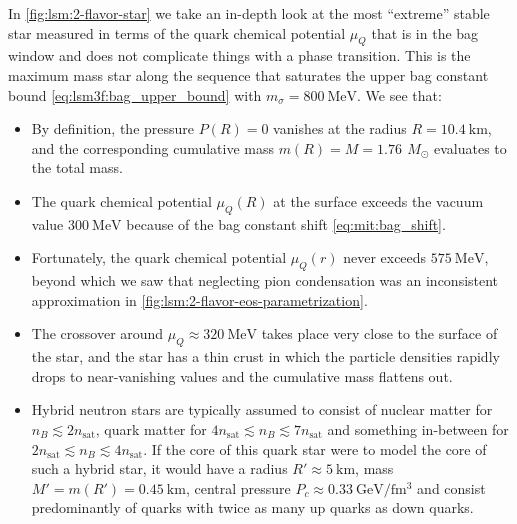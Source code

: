 In \cref{fig:lsm:2-flavor-star} we take an in-depth look at the most ``extreme'' stable star measured in terms of the quark chemical potential $\mu_Q$
that is in the bag window and does not complicate things with a phase transition.
This is the maximum mass star along the sequence that saturates the upper bag constant bound \eqref{eq:lsm3f:bag_upper_bound} with $m_\sigma=\SI{800}{\mega\electronvolt}$.
We see that:
\begin{itemize}
\item By definition, the pressure $P(R)=0$ vanishes at the radius $R=\SI{10.4}{\kilo\meter}$,
      and the corresponding cumulative mass $m(R)=M=\SI{1.76}{}\,M_\odot$ evaluates to the total mass.
\item The quark chemical potential $\mu_Q(R)$ at the surface exceeds the vacuum value $\SI{300}{\mega\electronvolt}$ because of the bag constant shift \eqref{eq:mit:bag_shift}.
\item Fortunately, the quark chemical potential $\mu_Q(r)$ never exceeds $\SI{575}{\mega\electronvolt}$, beyond which we saw that neglecting pion condensation was an inconsistent approximation in \cref{fig:lsm:2-flavor-eos-parametrization}.
\item The crossover around $\mu_Q \approx \SI{320}{\mega\electronvolt}$ takes place very close to the surface of the star,
      and the star has a thin crust in which the particle densities rapidly drops to near-vanishing values and the cumulative mass flattens out.
\item Hybrid neutron stars are typically assumed to consist of nuclear matter for $n_B \lesssim 2 n_\text{sat}$,
      quark matter for $4 n_\text{sat} \lesssim n_B \lesssim 7 n_\text{sat}$ and something in-between for $2 n_\text{sat} \lesssim n_B \lesssim 4 n_\text{sat}$.
      If the core of this quark star were to model the core of such a hybrid star,
      it would have a radius $R' \approx \SI{5}{\kilo\meter}$, mass $M'=m(R')=\SI{0.45}{\kilo\meter}$, central pressure $P_c \approx \SI{0.33}{\giga\electronvolt\per\femto\meter\cubed}$
      and consist predominantly of quarks with twice as many up quarks as down quarks.
\end{itemize}

